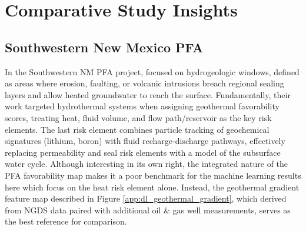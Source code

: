 \section{Comparative Study Insights}\label{ch5:case_insights}
\subsection{Southwestern New Mexico PFA}\label{ch5:caase_nm_pfa}
In the Southwestern NM PFA project, \citet{bielicki_hydrogeolgic_2015} focused on hydrogeologic windows, defined as areas where erosion, faulting, or volcanic intrusions breach regional sealing layers and allow heated groundwater to reach the surface. Fundamentally, their work targeted hydrothermal systems when assigning geothermal favorability scores, treating heat, fluid volume, and flow path/reservoir as the key risk elements. The last risk element combines particle tracking of geochemical signatures (lithium, boron) with fluid recharge-discharge pathways, effectively replacing permeability and seal risk elements with a model of the subsurface water cycle. Although interesting in its own right, the integrated nature of the PFA favorability map makes it a poor benchmark for the machine learning results here which focus on the heat risk element alone. Instead, the geothermal gradient feature map described in Figure \ref{app:dl_geothermal_gradient}, which \citet{bielicki_hydrogeolgic_2015} derived from NGDS data paired with additional oil \& gas well measurements, serves as the best reference for comparison. 

